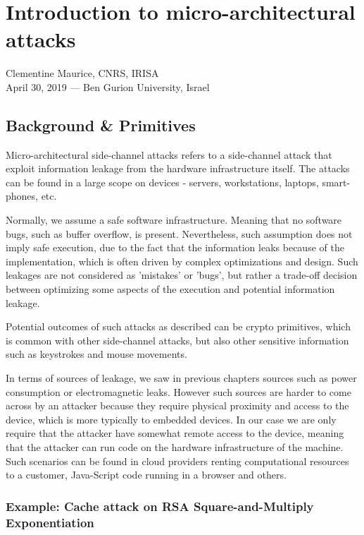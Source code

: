 \chapter{Introduction to micro-architectural attacks}
\label{chap:c7_cacheattacks}

Clementine Maurice, CNRS, IRISA\\
April 30, 2019 — Ben Gurion University, Israel

\section{Background \& Primitives} %
\label{sec:BackgroundnPrimitives}

Micro-architectural side-channel attacks refers to a side-channel attack that
exploit information leakage from the hardware infrastructure itself. The attacks
can be found in a large scope on devices - servers, workstations, laptops,
smart-phones, etc.

Normally, we assume a safe software infrastructure. Meaning that no software
bugs, such as buffer overflow, is present. Nevertheless, such assumption does
not imply safe execution, due to the fact that the information leaks because of
the implementation, which is often driven by complex optimizations and design.
Such leakages are not considered as 'mistakes' or 'bugs', but rather a trade-off
decision between optimizing some aspects of the execution and potential
information leakage.    

Potential outcomes of such attacks as described can be crypto primitives, which
is common with other side-channel attacks, but also other sensitive information
such as keystrokes and mouse movements.  

In terms of sources of leakage, we saw in previous chapters sources such as
power consumption or electromagnetic leaks. However such sources are harder to
come across by an attacker because they require physical proximity and access to
the device, which is more typically to embedded devices. In our case we are only
require that the attacker have somewhat remote access to the device, meaning
that the attacker can run code on the hardware infrastructure of the machine.
Such scenarios can be found in cloud providers renting computational resources
to a customer, Java-Script code running in a browser and others.

\subsection{Example: Cache attack on RSA Square-and-Multiply Exponentiation}
\label{subsec:CacheattackonRSA}

